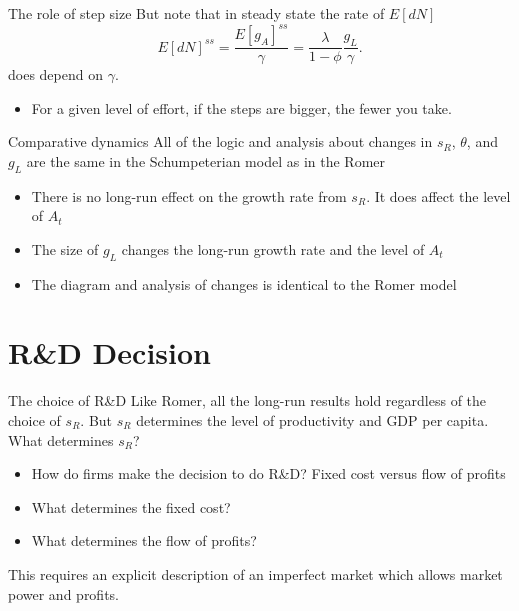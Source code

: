 \begin{frame}{The role of step size}
But note that in steady state the rate of $E[dN]$
\begin{equation}
	E[dN]^{ss} = \frac{E[g_A]^{ss}}{\gamma} = \frac{\lambda}{1-\phi}\frac{g_L}{\gamma}. \nonumber
\end{equation}
does depend on $\gamma$.
\begin{itemize}
	\item For a given level of effort, if the steps are bigger, the fewer you take. 
\end{itemize}
\end{frame}

\begin{frame}{Comparative dynamics}
All of the logic and analysis about changes in $s_R$, $\theta$, and $g_L$ are the same in the Schumpeterian model as in the Romer
\begin{itemize}
	\item There is no long-run effect on the growth rate from $s_R$. It does affect the level of $A_t$
	\item The size of $g_L$ changes the long-run growth rate and the level of $A_t$
	\item The diagram and analysis of changes is identical to the Romer model
\end{itemize}
\end{frame}

\section{R\&D Decision}
\begin{frame}{The choice of R\&D}
Like Romer, all the long-run results hold regardless of the choice of $s_R$. But $s_R$ determines the level of productivity and GDP per capita. What determines $s_R$?
\begin{itemize}
	\item How do firms make the decision to do R\&D? Fixed cost versus flow of profits
	\item What determines the fixed cost? 
	\item What determines the flow of profits?
\end{itemize}
This requires an explicit description of an imperfect market which allows market power and profits. 
\end{frame}

